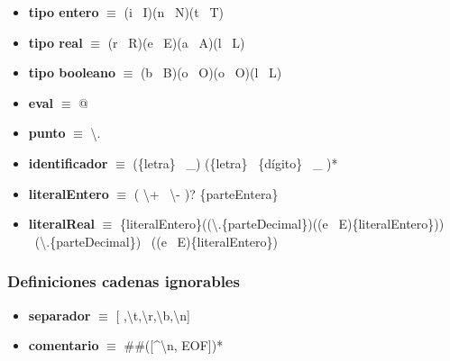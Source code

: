 \documentclass[11pt]{article}
\begin{document}
\begin{itemize}
            \item \textbf{tipo entero }$\equiv$ (i \textbar\ I)(n \textbar\ N)(t \textbar\ T)
            \item \textbf{tipo real }$\equiv$ (r \textbar\ R)(e \textbar\ E)(a \textbar\ A)(l \textbar\ L)
            \item \textbf{tipo booleano }$\equiv$ (b \textbar\ B)(o \textbar\ O)(o \textbar\ O)(l \textbar\ L)
            \item \textbf{eval }$\equiv$ @
            \item \textbf{punto }$\equiv$ \textbackslash.
            \item \textbf{identificador }$\equiv$ (\{letra\} \textbar\ \_) (\{letra\} \textbar\ \{dígito\} \textbar\ \_ )*
            \item \textbf{literalEntero }$\equiv$ ( \textbackslash + \textbar\ \textbackslash - )? \{parteEntera\}
            \item \textbf{literalReal }  $\equiv$ \{literalEntero\}((\textbackslash.\{parteDecimal\})((e \textbar\ E)\{literalEntero\})) \textbar\ (\textbackslash.\{parteDecimal\}) \textbar\ ((e \textbar\ E)\{literalEntero\})
        \end{itemize}
        \subsubsection*{Definiciones cadenas ignorables}
        \begin{itemize}
            \item \textbf{separador }$\equiv$ [ ,\textbackslash t,\textbackslash r,\textbackslash b,\textbackslash n]
            \item \textbf{comentario }$\equiv$ \#\#([\^{}\textbackslash n, EOF])*
        \end{itemize}
\end{document}
